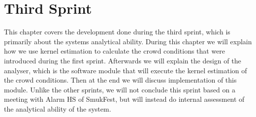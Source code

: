 \chapter{Third Sprint}

This chapter covers the development done during the third sprint, which is primarily about the systems analytical ability. During this chapter we will explain how we use kernel estimation to calculate the crowd conditions that were introduced during the first sprint. Afterwards we will explain the design of the analyser, which is the software module that will execute the kernel estimation of the crowd conditions. Then at the end we will discuss implementation of this module. Unlike the other sprints, we will not conclude this sprint based on a meeting with Alarm HS of SmukFest, but will instead do internal assessment of the analytical ability of the system.







